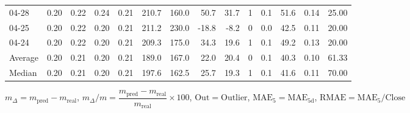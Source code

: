 \begin{threeparttable}
{\begin{tabular}{lrrrrrrrrrrrrr}
  04-28 &          0.20 &          0.22 &          0.24 &        0.21 &               210.7 &               160.0 &       50.7 &         31.7 &              1 &                 0.1 &             51.6 &            0.14 &                  25.00 \\
  04-25 &          0.20 &          0.22 &          0.20 &        0.21 &               211.2 &               230.0 &      -18.8 &         -8.2 &              0 &                 0.0 &             42.5 &            0.11 &                  20.00 \\
  04-24 &          0.20 &          0.22 &          0.20 &        0.21 &               209.3 &               175.0 &       34.3 &         19.6 &              1 &                 0.1 &             49.2 &            0.13 &                  20.00 \\
Average &          0.20 &          0.21 &          0.20 &        0.21 &               189.0 &               167.0 &       22.0 &         20.4 &              0 &                 0.1 &             40.3 &            0.10 &                  61.33 \\
 Median &          0.20 &          0.21 &          0.20 &        0.21 &               197.6 &               162.5 &       25.7 &         19.3 &              1 &                 0.1 &             41.6 &            0.11 &                  70.00 \\
\bottomrule
\end{tabular}
}
\begin{tablenotes}\footnotesize
\item $m_\Delta=m_{\text{pred}}-m_{\text{real}}$,
$m_\Delta/m=\dfrac{m_{\text{pred}}-m_{\text{real}}}{m_{\text{real}}}\times100$,
$\mathrm{Out}=\text{Outlier}$,
$\mathrm{MAE}_5=\mathrm{MAE}_{5\text{d}}$,
$\mathrm{RMAE}=\mathrm{MAE}_5/\text{Close}$
\end{tablenotes}
\end{threeparttable}
\endgroup

